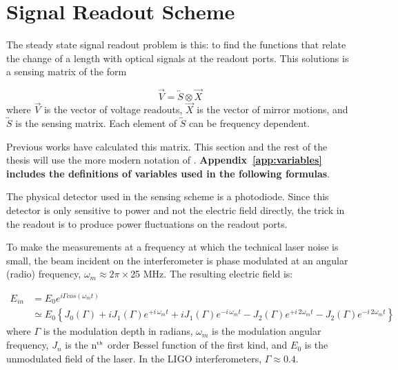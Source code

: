 \section{Signal Readout Scheme}

The steady state signal readout problem is this: to find the functions that
relate the change of a length with optical signals at the readout ports. 
This solutions is a sensing matrix of the form

\begin{equation}
\vec{V} = \overleftrightarrow{S} \otimes \vec{X}
\end{equation}
where $\vec{V}$ is the vector of voltage readouts, $\vec{X}$ is the vector of
mirror motions, and $\overleftrightarrow{S}$ is the sensing matrix. Each 
element of $\overleftrightarrow{S}$ can be frequency dependent. 

Previous works \cite{Regehr:Thesis,Sigg:FreqResp} have calculated 
this matrix. This section and the rest of the thesis will use the more modern 
notation of \cite{Sigg:FreqResp}. \textbf{Appendix~\ref{app:variables} includes 
the definitions of variables used in the following formulas}.

The physical detector used in the sensing scheme is a photodiode. Since this
detector is only sensitive to power and not the electric field directly, the
trick in the readout is to produce power fluctuations on the readout ports.

To make the measurements at a frequency at which the technical laser noise is
small, the beam incident on the interferometer is phase modulated at 
an angular (radio) frequency, $\omega_m \approx 2 \pi \times$25 MHz. The resulting 
electric field is:

\begin{equation} 
  \begin{aligned} \label{eq:InputBeam}
  E_{in} &= E_0 e^{i \Gamma cos(\omega_m t)} \\
         &\simeq E_0 \left \{ J_0(\Gamma) 
                    + i J_1(\Gamma)e^{+i \, \omega_m t}
                    + i J_1(\Gamma)e^{-i \, \omega_m t}
                    - J_2(\Gamma) e^{+i \, 2 \omega_m t}
                    - J_2(\Gamma) e^{-i \, 2 \omega_m t}
                     \right \}
  \end{aligned}  
\end{equation}
where $\Gamma$ is the modulation depth in radians, $\omega_m$ is the 
modulation angular frequency, $J_n$ is the n$^{\mbox{\tiny th}}$ order Bessel
function of the first kind, and $E_0$ is the unmodulated field of the laser. In
the LIGO interferometers, $\Gamma \approx 0.4$.

